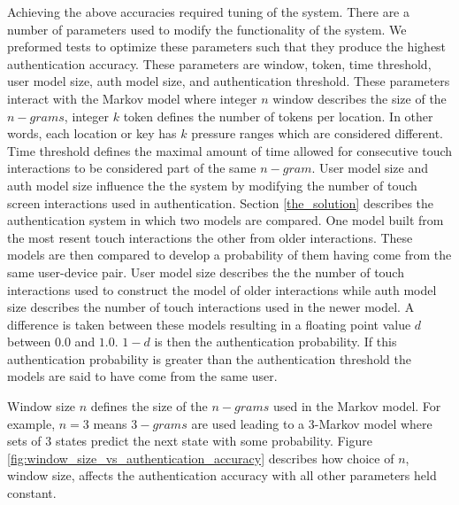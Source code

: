 Achieving the above accuracies required
tuning of the system.
%
There are a number of parameters used to 
modify the functionality of the system.
%
We preformed tests to optimize these parameters
such that they produce the highest authentication accuracy.
%
These parameters are
window,
token,
time threshold,
user model size,
auth model size, and
authentication threshold.
%
These parameters interact with the Markov model 
where integer $n$ window describes the size of the $n-grams$,
integer $k$ token defines the number of tokens per location.
In other words, each location or key has $k$ pressure
ranges which are considered different.
%
Time threshold defines the maximal amount of time
allowed for consecutive touch interactions 
to be considered part of the same $n-gram$.
%
User model size and auth model size influence
the the system by
modifying the number of touch screen interactions used in authentication.
%
Section \ref{the_solution} describes
the authentication system in which two models are compared.
One model built from the most resent touch interactions
the other from older interactions.
These models are then compared to develop
a probability of them having come from the same user-device pair.
%
User model size describes the the number of touch interactions used
to construct the model of older interactions while
auth model size describes the number of touch interactions
used in the newer model.
%
A difference is taken between these models
resulting in a floating point value $d$ between
$0.0$ and $1.0$.
$1 - d$ is then the authentication probability.
If this authentication probability is greater
than the authentication threshold the
models are said to have come from the same user.

%
Window size $n$ defines the size of the $n-grams$
used in the Markov model.
%
For example,
$n = 3$ means $3-grams$ are used leading to a $3$-Markov model where
sets of $3$ states predict the next state with some probability.
%
Figure \ref{fig:window_size_vs_authentication_accuracy}
describes how choice of $n$, window size, affects the authentication accuracy
with all other parameters held constant.
%

